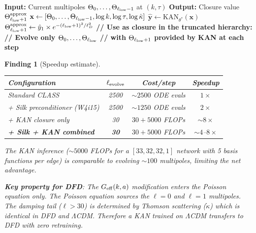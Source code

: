 \documentclass[11pt]{article}
\newtheorem{finding}[theorem]{Finding}
\theoremstyle{definition}
\theoremstyle{remark}
\newcommand{\LCDM}{$\Lambda$CDM}
\begin{document}
\begin{algorithm}[H]
\caption{MOND-KAN Boltzmann Closure: Online Inference in CLASS}
\label{alg:kan-infer}
\begin{algorithmic}[1]
\State \textbf{Input:} Current multipoles $\Theta_0, \ldots, \Theta_{\ell_{\rm low}-1}$
  at $(k, \tau)$
\State \textbf{Output:} Closure value $\Theta_{\ell_{\rm low}+1}^{\rm approx}$
\Statex
\State $\mathbf{x} \gets [\Theta_0, \ldots, \Theta_{\ell_{\rm low}-1},
  \log k, \log\tau, \log\dot\kappa]$
\State $\hat{\mathbf{y}} \gets \text{KAN}_{\theta^*}(\mathbf{x})$
\State $\Theta_{\ell_{\rm low}+1}^{\rm approx} \gets
  \hat{y}_1 \times e^{-(\ell_{\rm low}+1)^2/\ell_D^2}$
\Statex
\Statex \textbf{// Use as closure in the truncated hierarchy:}
\Statex \textbf{// Evolve only $\Theta_0, \ldots, \Theta_{\ell_{\rm low}}$}
\Statex \textbf{// with $\Theta_{\ell_{\rm low}+1}$ provided by KAN at each step}
\end{algorithmic}
\end{algorithm}

\begin{finding}[Speedup estimate]
\label{find:speedup}
\begin{center}
\begin{tabular}{@{}lccc@{}}
\toprule
\textbf{Configuration} & $\ell_{\rm evolve}$ & \textbf{Cost/step} &
\textbf{Speedup} \\
\midrule
Standard CLASS & 2500 & $\sim 2500$ ODE evals & $1\times$ \\
+ Silk preconditioner (W4i15) & 2500 & $\sim 1250$ ODE evals & $2\times$ \\
+ KAN closure only & 30 & $30 + 5000$ FLOPs & $\sim 8\times$ \\
\textbf{+ Silk + KAN combined} & \textbf{30} & $30 + 5000$ FLOPs &
$\sim 4$--$8\times$ \\
\bottomrule
\end{tabular}
\end{center}

The KAN inference ($\sim 5000$ FLOPs for a $[33, 32, 32, 1]$ network
with 5 basis functions per edge) is comparable to evolving $\sim 100$
multipoles, limiting the net advantage.

\textbf{Key property for DFD}: The $G_{\rm eff}(k,a)$ modification enters
the Poisson equation only. The Poisson equation sources the $\ell = 0$
and $\ell = 1$ multipoles. The damping tail ($\ell > 30$) is determined
by Thomson scattering ($\dot\kappa$) which is identical in DFD and
\LCDM. Therefore a KAN trained on \LCDM{} transfers to DFD with zero
retraining.
\end{finding}
\end{document}
